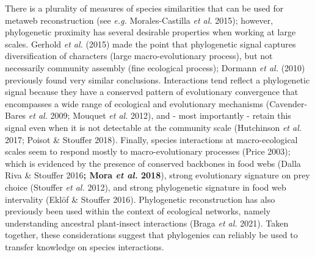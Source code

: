 \documentclass[11pt]{article}
\makeatletter
\def\maxwidth{\ifdim\Gin@nat@width>\linewidth\linewidth
\else\Gin@nat@width\fi}
\let\Oldincludegraphics\includegraphics
\renewcommand{\includegraphics}[1]{\Oldincludegraphics[width=\maxwidth]{#1}}
\providecommand{\DIFaddtex}[1]{{\bf #1}} %
\providecommand{\DIFaddbegin}{\protect\color{blue}} %
\providecommand{\DIFaddend}{\protect\color{black}} %
\providecommand{\DIFdelend}{\protect\color{black}} %
\providecommand{\DIFadd}[1]{\texorpdfstring{\DIFaddtex{#1}}{#1}} %
\newcommand{\DIFaddincludegraphics}[2][]{{\color{blue}\fbox{\DIFOincludegraphics[#1]{#2}}}} %
\DeclareRobustCommand{\DIFaddbegin}{\DIFOaddbegin \let\includegraphics\DIFaddincludegraphics} %
\DeclareRobustCommand{\DIFaddend}{\DIFOaddend \let\includegraphics\DIFOincludegraphics} %
\DeclareRobustCommand{\DIFdelend}{\DIFOaddend \let\includegraphics\DIFOincludegraphics} %
\makeatother
\begin{document}
\DIFdelend There is a plurality of
measures of species similarities that can be used for metaweb
reconstruction (see \emph{e.g.} Morales-Castilla \emph{et al.} 2015);
however, phylogenetic proximity has several desirable properties when
working at large scales. Gerhold \emph{et al.} (2015) made the point
that phylogenetic signal captures diversification of characters (large
macro-evolutionary process), but not necessarily community assembly
(fine ecological process); Dormann \emph{et al.} (2010) previously found
very similar conclusions. Interactions tend reflect a phylogenetic
signal because they have a conserved pattern of evolutionary convergence
that encompasses a wide range of ecological and evolutionary mechanisms
(Cavender-Bares \emph{et al.} 2009; Mouquet \emph{et al.} 2012), and -
most importantly - retain this signal even when it is not detectable at
the community scale (Hutchinson \emph{et al.} 2017; Poisot \& Stouffer
2018). Finally, species interactions at macro-ecological scales seem to
respond mostly to macro-evolutionary processes (Price 2003); which is
evidenced by the presence of conserved backbones in food webs (Dalla
Riva \& Stouffer 2016\DIFaddbegin \DIFadd{; Mora \emph{et al.} 2018}\DIFaddend ), strong evolutionary
signature on prey choice (Stouffer \emph{et al.} 2012), and strong
phylogenetic signature in food web intervality (Eklöf \& Stouffer 2016).
Phylogenetic reconstruction has also previously been used within the
context of ecological networks, namely understanding ancestral
plant-insect interactions (Braga \emph{et al.} 2021). Taken together,
these considerations suggest that phylogenies can reliably be used to
transfer knowledge on species interactions.
\end{document}
